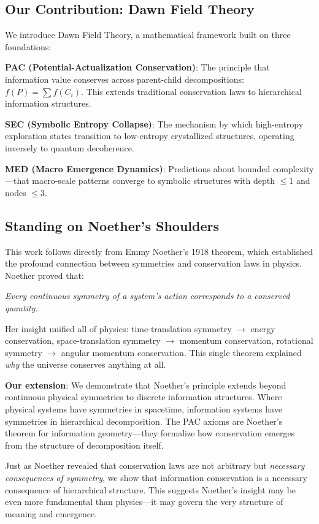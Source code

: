 \documentclass[11pt,a4paper]{article}
\begin{document}
\subsection{Our Contribution: Dawn Field Theory}

We introduce Dawn Field Theory, a mathematical framework built on three foundations:

\textbf{PAC (Potential-Actualization Conservation)}: The principle that information value conserves across parent-child decompositions: $f(P) = \sum f(C_i)$. This extends traditional conservation laws to hierarchical information structures.

\textbf{SEC (Symbolic Entropy Collapse)}: The mechanism by which high-entropy exploration states transition to low-entropy crystallized structures, operating inversely to quantum decoherence.

\textbf{MED (Macro Emergence Dynamics)}: Predictions about bounded complexity---that macro-scale patterns converge to symbolic structures with depth $\leq 1$ and nodes $\leq 3$.

\subsection{Standing on Noether's Shoulders}

This work follows directly from Emmy Noether's 1918 theorem, which established the profound connection between symmetries and conservation laws in physics. Noether proved that:

\begin{center}
\emph{Every continuous symmetry of a system's action corresponds to a conserved quantity.}
\end{center}

Her insight unified all of physics: time-translation symmetry $\to$ energy conservation, space-translation symmetry $\to$ momentum conservation, rotational symmetry $\to$ angular momentum conservation. This single theorem explained \emph{why} the universe conserves anything at all.

\textbf{Our extension}: We demonstrate that Noether's principle extends beyond continuous physical symmetries to discrete information structures. Where physical systems have symmetries in spacetime, information systems have symmetries in hierarchical decomposition. The PAC axioms are Noether's theorem for information geometry---they formalize how conservation emerges from the structure of decomposition itself.

Just as Noether revealed that conservation laws are not arbitrary but \emph{necessary consequences of symmetry}, we show that information conservation is a necessary consequence of hierarchical structure. This suggests Noether's insight may be even more fundamental than physics---it may govern the very structure of meaning and emergence.
\end{document}
